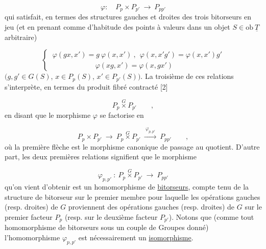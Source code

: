\begin{equation*}
\varphi : \quad P_p \times P_{p'} \ \longrightarrow\ P_{pp'}
\end{equation*}
qui satisfait, en termes des structures gauches et droites des trois bitorseurs en jeu (et en prenant comme d'habitude des points à valeurs dans un objet $S \in \mathrm{ob}\ \underline{T}$ arbitraire)

\begin{equation}\tag{1.1.3.0}
\left\{\ \begin{array}{l} \varphi(gx,x') = g\ \varphi(x,x')\ ,\ \ \varphi(x,x'g') = \varphi(x,x')g' \\[3ex] \qquad\qquad\qquad \varphi(xg,x') = \varphi(x,gx') \end{array}\right.
\end{equation}
$(g,g' \in G(S)$, $x \in P_p(S)$, $x' \in P_{p'}(S))$. La troisième de ces relations s'interprète, en termes du produit fibré contracté [2]

\begin{equation*}
P_p \overset{G}{\times} P_{p'} \qquad ,
\end{equation*}
en disant que le morphisme $\varphi$ se factorise en

\begin{equation*}
P_p \times P_{p'} \ \longrightarrow\ P_p \overset{G}{\times} P_{p'} \ \xrightarrow{\ \varphi_{p,p'}\ }\ P_{pp'} \qquad ,
\end{equation*}
où la première flèche est le morphisme canonique de passage au quotient. D'autre part, les deux premières relations signifient que le morphisme

\begin{equation}\tag{1.1.3.1}
\varphi_{p,p'} \ :\ P_p \overset{G}{\times} P_{p'} \ \longrightarrow\ P_{pp'}
\end{equation}
qu'on vient d'obtenir est un homomorphisme de \underline{bitorseurs}, compte tenu de la structure de bitorseur sur le premier membre pour laquelle les opérations
gauches (resp. droites) de $G$ proviennent des opérations gauches (resp. droites) de $G$ sur le premier facteur $P_p$ (resp. sur le deuxième facteur $P_{p'}$). Notons que (comme tout homomorphisme de bitorseurs sous un couple de Groupes donné) l'homomorphisme $\varphi_{p,p'}$ est nécessairement un \underline{isomorphisme}.

